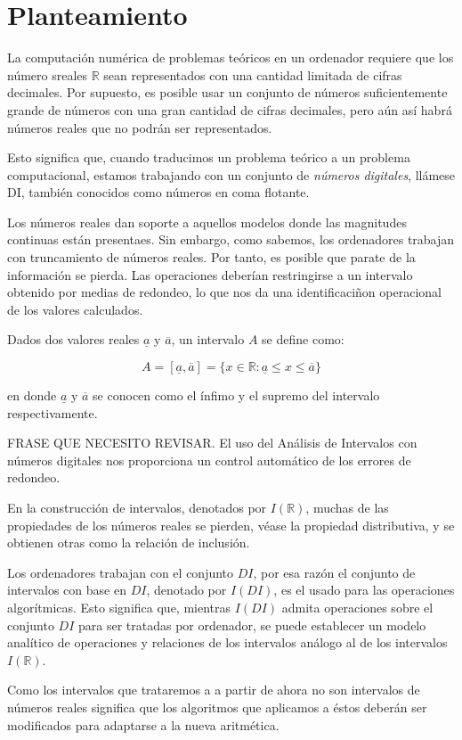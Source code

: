 \section{Planteamiento}

La computación numérica de problemas teóricos en un ordenador requiere que los número sreales $\mathbb{R}$ sean representados con una cantidad limitada de cifras decimales. Por supuesto, es posible usar un conjunto de números suficientemente grande de números con una gran cantidad de cifras decimales, pero aún así habrá números reales que no podrán ser representados.
\par Esto significa que, cuando traducimos un problema teórico a un problema computacional, estamos trabajando con un conjunto de{ \em números digitales}, llámese DI, también conocidos como números en coma flotante.
\par Los números reales dan soporte a aquellos modelos donde las magnitudes continuas están presentaes. Sin embargo, como sabemos, los ordenadores trabajan con truncamiento de números reales. Por tanto, es posible que parate de la información se pierda. Las operaciones deberían restringirse a un intervalo obtenido por medias de redondeo, lo que nos da una identificaciñon operacional de los valores calculados.
\par Dados dos valores reales $\underline{a}$ y $\overline{a}$, un intervalo $A$ se define como:

\begin{equation}
A = [\underline{a},\overline{a}] = \{ x \in \mathbb{R} : \underline{a} \leq x \leq \overline{a} \}
\nonumber
\end{equation}

en donde $\underline{a}$ y $\overline{a}$ se conocen como el ínfimo y el supremo del intervalo respectivamente.
\par FRASE QUE NECESITO REVISAR. El uso del Análisis de Intervalos con números digitales nos proporciona un control automático de los errores de redondeo.
\par En la construcción de intervalos, denotados por $I(\mathbb{R})$, muchas de las propiedades de los números reales se pierden, véase la propiedad distributiva, y se obtienen otras como la relación de inclusión.
\par Los ordenadores trabajan con el conjunto $DI$, por esa razón el conjunto de intervalos con base en $DI$, denotado por $I(DI)$, es el usado para las operaciones algorítmicas. Esto significa que, mientras $I(DI)$ admita operaciones sobre el conjunto $DI$ para ser tratadas por ordenador, se puede establecer un modelo analítico de operaciones y relaciones de los intervalos análogo al de los intervalos $I(\mathbb{R})$.
\par Como los intervalos que trataremos a a partir de ahora no son intervalos de números reales significa que los algoritmos que aplicamos a éstos deberán ser modificados para adaptarse a la nueva aritmética.

